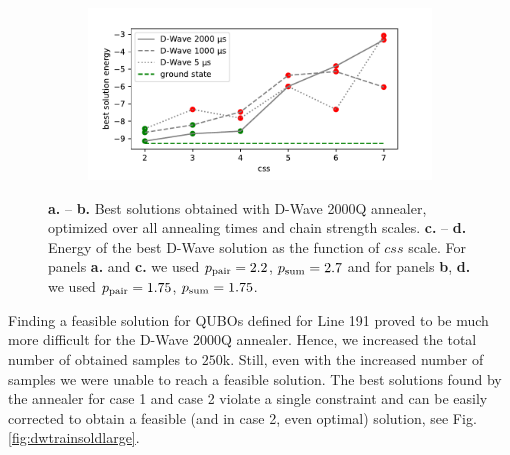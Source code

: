 \begin{figure}
\begin{subfigure}[b]{0.5\textwidth}
  \end{subfigure}
  \begin{subfigure}[b]{0.5\textwidth}
    \caption{}\label{fig:dwen2}
    \includegraphics[width=\textwidth]{figures/energy_small_175_175}
  \end{subfigure}
  \caption{
    \textbf{a.} -- \textbf{b.} Best solutions obtained with D-Wave 2000Q annealer,
    optimized over all annealing times and chain strength scales.
    \textbf{c.} -- \textbf{d.} Energy of the best D-Wave solution as the function of
    $css$ scale. For panels \textbf{a.} and \textbf{c.} we used $p_{\text{pair}}=2.2$, $p_{\text{sum}}=2.7$
    and for panels \textbf{b}, \textbf{d.} we used $p_{\text{pair}}=1.75$, $p_{\text{sum}}=1.75$.
  }
  \label{fig:dwtrainsold}
\end{figure}

Finding a feasible solution for QUBOs defined for Line 191 proved to be much
more difficult for the D-Wave 2000Q annealer. Hence, we increased the total
number of obtained samples to $250$k. Still, even with the increased number of
samples we were unable to reach a feasible solution. The best solutions found
by the annealer for case 1 and case 2 violate a single constraint and can be
easily corrected to obtain a feasible (and in case 2, even optimal) solution,
see Fig. \ref{fig:dwtrainsoldlarge}.

